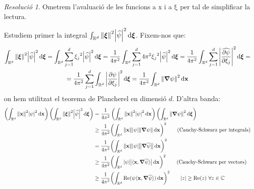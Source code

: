 \documentclass[10pt,a4paper]{article}
\newcommand{\RR}{\ensuremath{\mathbb{R}}} %
\newcommand{\CC}{\ensuremath{\mathbb{C}}} %
\newcommand{\vf}[1]{\boldsymbol{\mathrm{#1}}} %
\theoremstyle{definition}
\theoremstyle{remark}
\newtheorem*{res}{Resolució}
\begin{document}
\begin{res}
  Ometrem l'avaluació de les funcions a $\vf{x}$ i a $\vf{\xi}$ per tal de simplificar la lectura.

  Estudiem primer la integral $\int_{\RR^d} \norm{\vf\xi}^2 \abs{\widehat{\psi}}^2\dd{\vf\xi}$. Fixem-nos que:
  \begin{multline*}
    \int_{\RR^d} \norm{\vf\xi}^2 \abs{\widehat{\psi}}^2\dd{\vf\xi}=\int_{\RR^d}\sum_{j=1}^d{\xi_j}^2\abs{\widehat{\psi}}^2\dd{\vf\xi}=\frac{1}{4\pi^2}\int_{\RR^d}\sum_{j=1}^d4\pi^2{\xi_j}^2\abs{\widehat{\psi}}^2\dd{\vf\xi}=\frac{1}{4\pi^2}\int_{\RR^d}\sum_{j=1}^d\abs{\widehat{\pdv{\psi}{\xi_j}}}^2\dd{\vf\xi}=\\
    =\frac{1}{4\pi^2}\sum_{j=1}^d\int_{\RR^d}\abs{{\pdv{\psi}{\xi_j}}}^2\dd{\vf\xi}=\frac{1}{4\pi^2}\int_{\RR^d}\norm{{\grad\psi}}^2\dd{\vf{x}}
  \end{multline*}
  on hem utilitzat el teorema de Plancherel en dimensió $d$. D'altra banda:
  \begin{align*}
    \left(\int_{\RR^d} \norm{\vf{x}}^2 \abs{\psi}^2\dd{\vf{x}}\right)\left(\int_{\RR^d} \norm{\vf\xi}^2 \abs{\widehat{\psi}}^2\dd{\vf\xi}\right) & =\frac{1}{4\pi^2}\left(\int_{\RR^d} \norm{\vf{x}}^2 \abs{\psi}^2\dd{\vf{x}}\right)\left(\int_{\RR^d}\norm{{\grad\psi}}^2\dd{\vf\xi}\right)                              \\                                                                                                                                             & \geq \frac{1}{4\pi^2}{\left(\int_{\RR^d} \norm{\vf{x}} \abs{\psi}\norm{{\grad\psi}}\dd{\vf{x}}\right)}^2  \qquad\text{(Cauchy-Schwarz per integrals)}                                 \\
                                                                                                                                                 & = \frac{1}{4\pi^2}{\left(\int_{\RR^d} \norm{\vf{x}} \abs{\psi}\norm{{\grad\overline\psi}}\dd{\vf{x}}\right)}^2                                                          \\
                                                                                                                                                 & \geq \frac{1}{4\pi^2}{\left(\int_{\RR^d}  \abs{\psi}\abs{\langle\vf{x},\grad\overline\psi\rangle}\dd{\vf{x}}\right)}^2        \qquad\text{(Cauchy-Schwarz per vectors)} \\
                                                                                                                                                 & \geq \frac{1}{4\pi^2}{\left(\int_{\RR^d}  \Re(\psi\langle\vf{x},\grad\overline\psi\rangle)\dd{\vf{x}}\right)}^2  \qquad\text{$\abs{z}\geq \Re(z)$ $\forall z\in\CC$}    \\

\end{align*}
\end{res}
\end{document}
